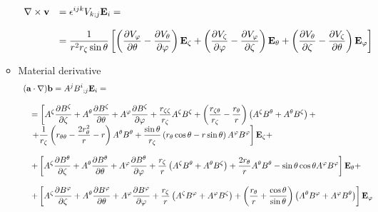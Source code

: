 \begin{itemize}
\begin{itemize}
\begin{equation}
\begin{array}{rl}
\displaystyle \nabla\times\mathbf{v} &
\displaystyle = \epsilon^{ijk}V_{k;j}\mathbf{E}_i=\\
\\
&\displaystyle = \frac{1}{r^2r_\zeta\sin\theta}\left[
\left(\frac{\partial V_\varphi}{\partial\theta}-
\frac{\partial V_\theta}{\partial\varphi}\right)\mathbf{E}_\zeta +
\left(\frac{\partial V_\zeta}{\partial\varphi}-
\frac{\partial V_\varphi}{\partial\zeta}\right)\mathbf{E}_\theta +
\left(\frac{\partial V_\theta}{\partial\zeta}-
\frac{\partial V_\zeta}{\partial\theta}\right)\mathbf{E}_\varphi\right]\\
\end{array}
\end{equation}
\item Material derivative
\begin{equation}
\begin{array}{l}
\displaystyle(\mathbf{a}\cdot\nabla)\mathbf{b}
 =A^j{B^i}_{;j}\mathbf{E}_i=\\
\\
\quad\displaystyle =\left[A^\zeta\frac{\partial B^\zeta}{\partial\zeta}+
A^\theta\frac{\partial B^\zeta}{\partial\theta}+A^\varphi\frac{\partial B^\zeta}{\partial\varphi}
+\frac{r_{\zeta\zeta}}{r_\zeta}A^\zeta B^\zeta+\left(\frac{r_{\zeta\theta}}{r_\zeta}-\frac{r_\theta}{r}
\right)\left(A^\zeta B^\theta+A^\theta B^\zeta\right)+\right.\\
\quad\displaystyle \left. +\frac{1}{r_\zeta}\left(r_{\theta\theta}-
\frac{2r_\theta^2}{r}-r\right)A^\theta B^\theta+\frac{\sin\theta}{r_\zeta}\left(
r_\theta\cos\theta-r\sin\theta\right)A^\varphi B^{\varphi}\right]\mathbf{E}_\zeta +\\
\\
\quad\displaystyle +\left[A^\zeta\frac{\partial B^\theta}{\partial\zeta}+
A^\theta\frac{\partial B^\theta}{\partial\theta}+A^\varphi\frac{\partial B^\theta}{\partial\varphi}
+\frac{r_\zeta}{r}\left(A^\zeta B^\theta+A^\theta B^\zeta\right)
+\frac{2r_\theta}{r}A^\theta B^\theta-
\sin\theta\cos\theta A^\varphi B^{\varphi}\right]\mathbf{E}_\theta +\\
\\
\quad\displaystyle +\left[A^\zeta\frac{\partial B^\varphi}{\partial\zeta}+
A^\theta\frac{\partial B^\varphi}{\partial\theta}+A^\varphi\frac{\partial B^\varphi}{\partial\varphi}
+\frac{r_\zeta}{r}\left(A^\zeta B^\varphi+A^\varphi B^\zeta\right)
+\left(\frac{r_\theta}{r}+\frac{\cos\theta}{\sin\theta}\right)
\left(A^\theta B^\varphi+A^\varphi B^\theta\right)\right]\mathbf{E}_\varphi\\
\end{array}
\end{equation}
\end{itemize}


\end{itemize}
